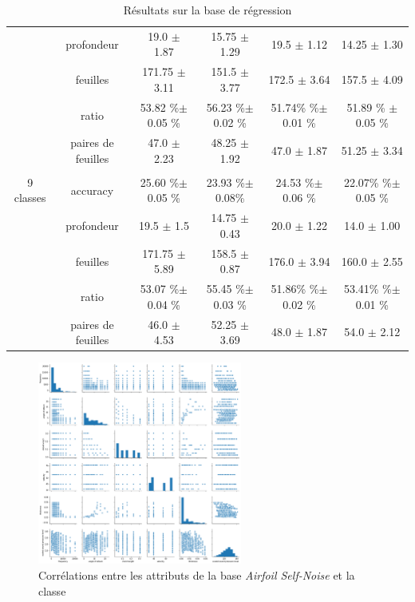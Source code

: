 \documentclass[a4paper]{article}
\begin{document}
\begin{table}
{\begin{tabular}{|*{6}{c|}}
     & profondeur & 19.0 $\pm$ 1.87 & 15.75 $\pm$ 1.29& 19.5 $\pm$ 1.12& 14.25 $\pm$ 1.30 \\

     & feuilles  & 171.75 $\pm$ 3.11 & 151.5 $\pm$ 3.77 & 172.5 $\pm$ 3.64 & 157.5 $\pm$ 4.09 \\

     & ratio  & 53.82 \%$\pm$ 0.05 \%& 56.23 \%$\pm$ 0.02 \%& 51.74\% \%$\pm$ 0.01 \%& 51.89 \% $\pm$ 0.05 \% \\

     & paires de feuilles & 47.0 $\pm$ 2.23 & 48.25 $\pm$ 1.92 & 47.0 $\pm$ 1.87& 51.25 $\pm$ 3.34\\

    & & & & & \\

     9 classes & accuracy  & 25.60 \%$\pm$ 0.05 \%  & 23.93 \%$\pm$ 0.08\%  & 24.53 \%$\pm$ 0.06 \% & 22.07\% \%$\pm$ 0.05 \% \\

     & profondeur  & 19.5 $\pm$ 1.5 & 14.75 $\pm$ 0.43 & 20.0 $\pm$ 1.22 & 14.0
     $\pm$ 1.00  \\

     & feuilles  & 171.75 $\pm$ 5.89 & 158.5 $\pm$ 0.87 & 176.0 $\pm$
     3.94 & 160.0 $\pm$ 2.55 \\

     & ratio  & 53.07 \%$\pm$ 0.04 \%& 55.45 \%$\pm$ 0.03
     \%& 51.86\% \%$\pm$ 0.02 \%& 53.41\% \%$\pm$ 0.01 \% \\

     & paires de feuilles  & 46.0 $\pm$ 4.53 & 52.25 $\pm$ 3.69& 48.0
     $\pm$ 1.87 & 54.0 $\pm$ 2.12 \\
    \hline

\end{tabular}}
\caption{Résultats sur la base de régression}
\label{tab:resultats-regression}
\end{table}

\begin{figure}[H]
	\center 
	\includegraphics[width=0.6\textwidth]{images/airfoil.png}
    \caption{Corrélations entre les attributs de la base \emph{Airfoil
    Self-Noise}
    et la classe}
    \label{img:airfoil}
\end{figure}
\end{document}
